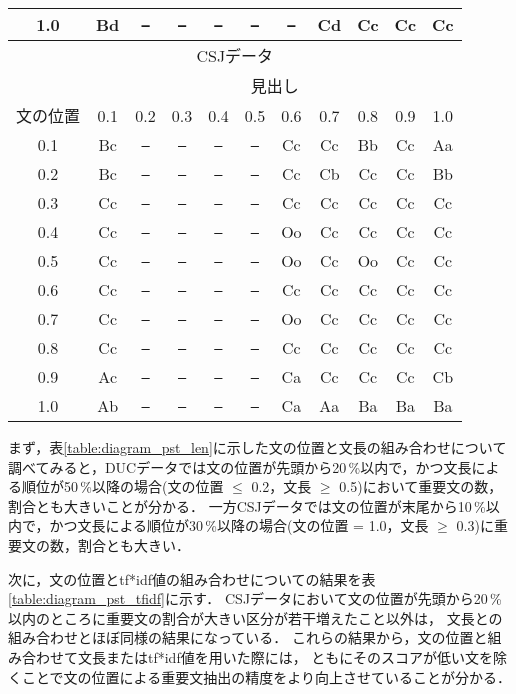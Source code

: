 \begin{table}[tb]
\begin{center}
\begin{tabular}{c|cccccccccc}
1.0                    & Bd & {\tt --} & {\tt --} & {\tt --} & {\tt --} & {\tt --} & Cd & Cc & Cc & Cc \\
\hline \hline 
\multicolumn{11}{c}{CSJデータ} \\ \hline
 & \multicolumn{10}{c}{見出し} \\ \cline{2-11}
文の位置 & 0.1 & 0.2 & 0.3 & 0.4 & 0.5 & 0.6 & 0.7 & 0.8 & 0.9 & 1.0 \\ \hline
0.1                    & Bc & {\tt --} & {\tt --} & {\tt --} & {\tt --} & Cc & Cc & Bb & Cc & Aa \\
0.2                    & Bc & {\tt --} & {\tt --} & {\tt --} & {\tt --} & Cc & Cb & Cc & Cc & Bb \\
0.3                    & Cc & {\tt --} & {\tt --} & {\tt --} & {\tt --} & Cc & Cc & Cc & Cc & Cc \\
0.4                    & Cc & {\tt --} & {\tt --} & {\tt --} & {\tt --} & Oo & Cc & Cc & Cc & Cc \\
0.5                    & Cc & {\tt --} & {\tt --} & {\tt --} & {\tt --} & Oo & Cc & Oo & Cc & Cc \\
0.6                    & Cc & {\tt --} & {\tt --} & {\tt --} & {\tt --} & Cc & Cc & Cc & Cc & Cc \\
0.7                    & Cc & {\tt --} & {\tt --} & {\tt --} & {\tt --} & Oo & Cc & Cc & Cc & Cc \\
0.8                    & Cc & {\tt --} & {\tt --} & {\tt --} & {\tt --} & Cc & Cc & Cc & Cc & Cc \\
0.9                    & Ac & {\tt --} & {\tt --} & {\tt --} & {\tt --} & Ca & Cc & Cc & Cc & Cb \\
1.0                    & Ab & {\tt --} & {\tt --} & {\tt --} & {\tt --} & Ca & Aa & Ba & Ba & Ba \\
\hline
\end{tabular}
\end{center}
\end{table}

まず，表\ref{table:diagram_pst_len}に示した文の位置と文長の組み合わせについて調べてみると，DUCデータでは文の位置が先頭から20\,\%以内で，かつ文長による順位が50\,\%以降の場合(文の位置 \(\le\) 0.2，文長 \(\ge\) 0.5)において重要文の数，割合とも大きいことが分かる．
一方CSJデータでは文の位置が末尾から10\,\%以内で，かつ文長による順位が30\,\%以降の場合(文の位置 = 1.0，文長 \(\ge\) 0.3)に重要文の数，割合とも大きい．

次に，文の位置とtf*idf値の組み合わせについての結果を表\ref{table:diagram_pst_tfidf}に示す．
CSJデータにおいて文の位置が先頭から20\,\%以内のところに重要文の割合が大きい区分が若干増えたこと以外は，
文長との組み合わせとほぼ同様の結果になっている．
これらの結果から，文の位置と組み合わせて文長またはtf*idf値を用いた際には，
ともにそのスコアが低い文を除くことで文の位置による重要文抽出の精度をより向上させていることが分かる．


